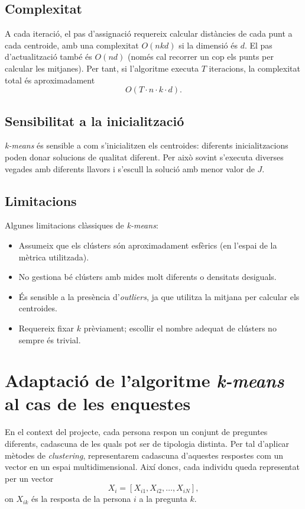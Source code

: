 \documentclass[a4paper,11pt]{article}
\begin{document}
\subsection{Complexitat}

A cada iteració, el pas d'assignació requereix calcular distàncies
de cada punt a cada centroide, amb una complexitat
$O(nkd)$ si la dimensió és $d$.
El pas d’actualització també és $O(nd)$ (només cal recorrer un cop els punts
per calcular les mitjanes). Per tant,
si l’algoritme executa $T$ iteracions, la complexitat total és
aproximadament
\[
  O(T \cdot n \cdot k \cdot d).
\]

\subsection{Sensibilitat a la inicialització}

\textit{k-means} és sensible a com s’inicialitzen els centroides:
diferents inicialitzacions poden donar solucions de qualitat diferent.
Per això sovint s’executa diverses vegades amb diferents llavors
i s’escull la solució amb menor valor de $J$.

\subsection{Limitacions}

Algunes limitacions clàssiques de \textit{k-means}:

\begin{itemize}
  \item Assumeix que els clústers són aproximadament esfèrics
        (en l’espai de la mètrica utilitzada).
  \item No gestiona bé clústers amb mides molt diferents
        o densitats desiguals.
  \item És sensible a la presència d’\emph{outliers}, ja que
        utilitza la mitjana per calcular els centroides.
  \item Requereix fixar $k$ prèviament; escollir el nombre adequat
        de clústers no sempre és trivial.
\end{itemize}

\section{Adaptació de l'algoritme \textit{k-means} al cas de les enquestes}

En el context del projecte, cada persona respon un conjunt de preguntes
diferents, cadascuna de les quals pot ser de tipologia distinta.
Per tal d’aplicar mètodes de \textit{clustering}, representarem cadascuna
d’aquestes respostes com un vector en un espai multidimensional.
Així doncs, cada individu queda representat per un vector
\[
  X_i = [X_{i1}, X_{i2}, \dots, X_{iN}],
\]
on $X_{ik}$ és la resposta de la persona $i$ a la pregunta $k$.
\end{document}

